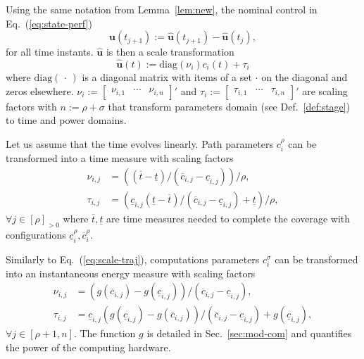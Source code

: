 \documentclass[letterpaper,10pt,journal,twoside]{IEEEtran}
\theoremstyle{definition}
\begin{document}
Using the same notation from Lemma~\ref{lem:new}, the nominal control in Eq.~(\ref{eq:state-perf})
\begin{equation}
  \mathbf{u}(t_{j+1}):=\hat{\mathbf{u}}(t_{j+1})-\hat{\mathbf{u}}(t_j),
\end{equation}
for all time instants. $\hat{\mathbf{u}}$ is then a scale transformation
\begin{equation}
  \hat{\mathbf{u}}(t):=\mathrm{diag}(\nu_i)c_i(t)+\tau_i
\end{equation}
where $\mathrm{diag}(\,\cdot\,)$ is a diagonal matrix with items of a set $\cdot$ on the diagonal and zeros elsewhere. $\nu_i:=\begin{bmatrix}\nu_{i,1}&\cdots&\nu_{i,n}\end{bmatrix}'$ and $\tau_i:=\begin{bmatrix}\tau_{i,1}&\cdots&\tau_{i,n}\end{bmatrix}'$ are scaling factors with $n:=\rho+\sigma$ that transform parameters domain (see Def.~\ref{def:stage}) to time and power domains.

Let us assume that the time evolves linearly. Path parameters $c_i^\rho$ can be transformed into a time measure with scaling factors\begin{subequations}\label{eq:scale-traj}\begin{align}
  \nu_{i,j}&=\left((\overline{t}-\underline{t})/(\overline{c}_{i,j}-\underline{c}_{i,j})\right)/\rho,\\
  \tau_{i,j}&=\left(\underline{c}_{i,j}(\underline{t}-\overline{t})/(\overline{c}_{i,j}-\underline{c}_{i,j})+\underline{t}\right)/\rho,
\end{align}\end{subequations} 
$\forall j\in[\rho]_{>0}$ where $\overline{t},\underline{t}$ are time measures needed to complete the coverage with configurations $\underline{c}_i^\rho,\overline{c}_i^\rho$.

Similarly to Eq.~(\ref{eq:scale-traj}), computations parameters $c_i^\sigma$ can be transformed into an instantaneous energy measure with scaling factors
\begin{subequations}\label{eq:scale-comp}\begin{align}
  \nu_{i,j}&=(g(\overline{c}_{i,j})-g(\underline{c}_{i,j}))/(\overline{c}_{i,j}-\underline{c}_{i,j}),\\
  \tau_{i,j}&=\underline{c}_{i,j}(g(\underline{c}_{i,j})-g(\overline{c}_{i,j}))/(\overline{c}_{i,j}-\underline{c}_{i,j})+g(\underline{c}_{i,j}),
\end{align}\end{subequations}
$\forall j\in[\rho+1,n]$. The function $g$ is detailed in Sec.~\ref{sec:mod-com} and quantifies the power of the computing hardware.
\end{document}
